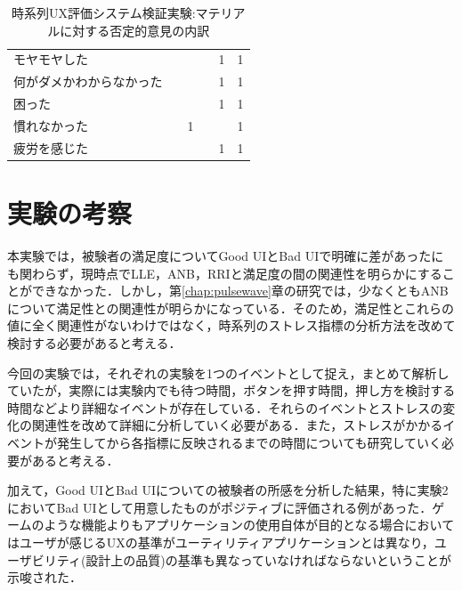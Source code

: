 \begin{table}[htbp]
\begin{tabular}{lrrrrr}
モヤモヤした       &                             &                            &                             & 1                          & 1                                       \\
何がダメかわからなかった &                             &                            &                             & 1                          & 1                                       \\
困った          &                             &                            &                             & 1                          & 1                                       \\
慣れなかった       &                             & 1                          &                             &                            & 1                                       \\
疲労を感じた       &                             &                            &                             & 1                          & 1                                      \\ \hline
\end{tabular}
\caption{時系列UX評価システム検証実験:マテリアルに対する否定的意見の内訳}
\label{table:nega}
\end{table}

\section{実験の考察}

本実験では，被験者の満足度についてGood UIとBad UIで明確に差があったにも関わらず，現時点でLLE，ANB，RRIと満足度の間の関連性を明らかにすることができなかった．しかし，第\ref{chap:pulsewave}章の研究では，少なくともANBについて満足性との関連性が明らかになっている．そのため，満足性とこれらの値に全く関連性がないわけではなく，時系列のストレス指標の分析方法を改めて検討する必要があると考える．

今回の実験では，それぞれの実験を1つのイベントとして捉え，まとめて解析していたが，実際には実験内でも待つ時間，ボタンを押す時間，押し方を検討する時間などより詳細なイベントが存在している．それらのイベントとストレスの変化の関連性を改めて詳細に分析していく必要がある．また，ストレスがかかるイベントが発生してから各指標に反映されるまでの時間についても研究していく必要があると考える．

加えて，Good UIとBad UIについての被験者の所感を分析した結果，特に実験2においてBad UIとして用意したものがポジティブに評価される例があった．ゲームのような機能よりもアプリケーションの使用自体が目的となる場合においてはユーザが感じるUXの基準がユーティリティアプリケーションとは異なり，ユーザビリティ(設計上の品質)の基準も異なっていなければならないということが示唆された．



